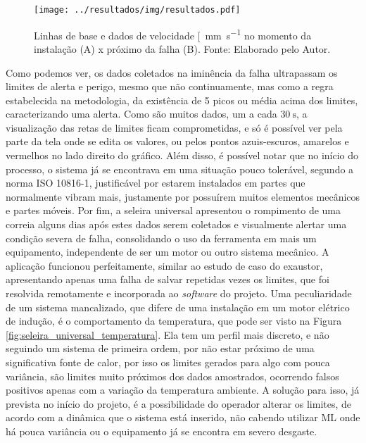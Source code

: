 \documentclass[a4paper]{ifacconf}
\begin{document}
\begin{figure}[h!]
  \begin{center}
      \texttt{[image: ../resultados/img/resultados.pdf]}
  \end{center}
  \caption{Linhas de base e dados de velocidade [\SI{}{\milli\metre\per\second} no momento da instalação
  (A) x próximo da falha (B). Fonte: Elaborado pelo Autor.}
  \label{fig:seleira_universal_antes_depois}
\end{figure}


Como podemos ver, os dados coletados na iminência da falha ultrapassam os limites de alerta e perigo, mesmo que não continuamente, mas
como a regra estabelecida na metodologia, da existência de 5 picos ou média acima dos limites, caracterizando uma alerta. Como são muitos dados,
um a cada $\SI{30}{\second}$, a visualização das retas de limites ficam comprometidas, e só é possível ver pela parte da tela onde se edita os
valores, ou pelos pontos azuis-escuros, amarelos e vermelhos no lado direito do gráfico. Além disso, é possível notar que no início do processo,
o sistema já se encontrava em uma situação pouco tolerável, segundo a norma ISO 10816-1, justificável por estarem instalados em partes que 
normalmente vibram mais, justamente por possuírem muitos elementos mecânicos e partes móveis. Por fim, a seleira universal apresentou o rompimento de uma
correia alguns dias após estes dados serem coletados e visualmente alertar uma condição severa de falha, consolidando o uso da ferramenta em
mais um equipamento, independente de ser um motor ou outro sistema mecânico. A aplicação funcionou perfeitamente, similar ao estudo de caso do
exaustor, apresentando apenas uma falha de salvar repetidas vezes os limites, que foi resolvida remotamente e incorporada ao \textit{software} do projeto.
Uma peculiaridade de um sistema mancalizado, que difere de uma instalação em um motor elétrico de indução, é o comportamento da temperatura,
que pode ser visto na Figura \ref{fig:seleira_universal_temperatura}. 
Ela tem um perfil mais discreto, e não seguindo um sistema de primeira ordem, por não estar próximo de uma significativa fonte de calor, por isso
os limites gerados para algo com pouca variância, são limites muito próximos dos dados amostrados, ocorrendo falsos positivos apenas com a
variação da temperatura ambiente. A solução para isso, já prevista no início do projeto, é a possibilidade do operador alterar os limites, de 
acordo com a dinâmica que o sistema está inserido, não cabendo utilizar  ML onde há pouca variância ou o equipamento já se 
encontra em severo desgaste. 
\end{document}
